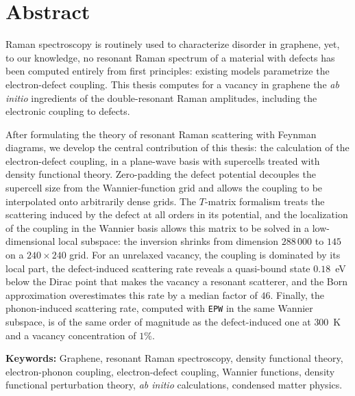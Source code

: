 \anglais
\chapter*{Abstract}

Raman spectroscopy is routinely used to characterize disorder in graphene, yet, to our knowledge, no resonant Raman spectrum of a material with defects has been computed entirely from first principles: existing models parametrize the electron-defect coupling. This thesis computes for a vacancy in graphene the \textit{ab initio} ingredients of the double-resonant Raman amplitudes, including the electronic coupling to defects. 

After formulating the theory of resonant Raman scattering with Feynman diagrams, we develop the central contribution of this thesis: the calculation of the electron-defect coupling, in a plane-wave basis with supercells treated with density functional theory. Zero-padding the defect potential decouples the supercell size from the Wannier-function grid and allows the coupling to be interpolated onto arbitrarily dense grids. The $T$-matrix formalism treats the scattering induced by the defect at all orders in its potential, and the localization of the coupling in the Wannier basis allows this matrix to be solved in a low-dimensional local subspace: the inversion shrinks from dimension $288\,000$ to $145$ on a $240\times 240$ grid. For an unrelaxed vacancy, the coupling is dominated by its local part, the defect-induced scattering rate reveals a quasi-bound state $0.18$~eV below the Dirac point that makes the vacancy a resonant scatterer, and the Born approximation overestimates this rate by a median factor of $46$. Finally, the phonon-induced scattering rate, computed with \texttt{EPW} in the same Wannier subspace, is of the same order of magnitude as the defect-induced one at $300$~K and a vacancy concentration of $1$\%.

\bigskip
{\bf Keywords:} Graphene, resonant Raman spectroscopy, density functional theory, electron-phonon coupling, electron-defect coupling, Wannier functions, density functional perturbation theory, \textit{ab initio} calculations, condensed matter physics.